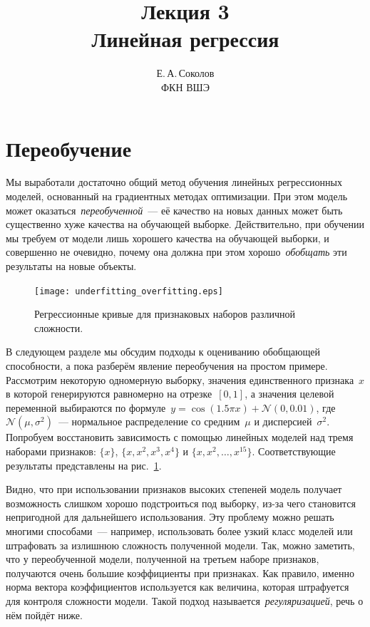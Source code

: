 \documentclass[12pt,fleqn]{article}
\begin{document}
\title{Лекция 3\\Линейная регрессия}
\author{Е.\,А.\,Соколов\\ФКН ВШЭ}
\maketitle

\section{Переобучение}

Мы выработали достаточно общий метод обучения линейных регрессионных моделей,
основанный на градиентных методах оптимизации.
При этом модель может оказаться~\emph{переобученной}~--- её качество
на новых данных может быть существенно хуже качества на обучающей выборке.
Действительно, при обучении мы требуем от модели лишь хорошего качества на обучающей выборки,
и совершенно не очевидно, почему она должна при этом хорошо~\emph{обобщать} эти результаты
на новые объекты.

\begin{figure}[t]
    \centering
    \texttt{[image: underfitting\_overfitting.eps]}
    \caption{Регрессионные кривые для признаковых наборов различной сложности.}
    \label{fig:overfitting}
\end{figure}

В следующем разделе мы обсудим подходы к оцениванию обобщающей способности,
а пока разберём явление переобучения на простом примере.
Рассмотрим некоторую одномерную выборку, значения единственного признака~$x$
в которой генерируются равномерно на отрезке~$[0, 1]$,
а значения целевой переменной выбираются по формуле~$y = \cos(1.5 \pi x) + \mathcal{N}(0, 0.01)$,
где~$\mathcal{N}(\mu, \sigma^2)$~--- нормальное распределение со средним~$\mu$ и дисперсией~$\sigma^2$.
Попробуем восстановить зависимость с помощью линейных моделей над тремя наборами признаков:
$\{x\}$, $\{x, x^2, x^3, x^4\}$ и $\{x, x^2, \dots, x^{15}\}$.
Соответствующие результаты представлены на рис.~\ref{fig:overfitting}.

Видно, что при использовании признаков высоких степеней модель получает возможность
слишком хорошо подстроиться под выборку, из-за чего становится непригодной для дальнейшего использования.
Эту проблему можно решать многими способами~--- например, использовать более узкий класс моделей
или штрафовать за излишнюю сложность полученной модели.
Так, можно заметить, что у переобученной модели, полученной на третьем наборе признаков,
получаются очень большие коэффициенты при признаках.
Как правило, именно норма вектора коэффициентов используется как величина,
которая штрафуется для контроля сложности модели.
Такой подход называется~\emph{регуляризацией}, речь о нём пойдёт ниже.
\end{document}
